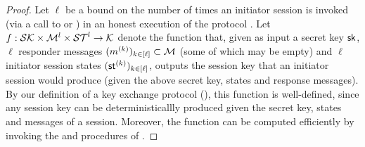 \begin{proof}
  Let \(\ell\) be a bound on the number of times an initiator session
  is invoked (via a call to \Init or \Run) in an honest execution of the protocol \prot{}.
  Let \(f : \mathcal{SK} \times \mathcal{M}^{l} \times \mathcal{ST}^{l} \to \mathcal{K} \)
  denote the function that, given as input a secret key \(\mathsf{sk}\),
  \(\ell\) responder messages \((m^{(k)})_{k \in [\ell]} \subset \mathcal{M}\) (some of which may be empty)
  and \(\ell\) initiator session states \((\mathsf{st}^{(k)})_{k \in [\ell]}\),
  outputs the session key that an initiator session would produce
  (given the above secret key, states and response messages).
  By our definition of a key exchange protocol (),
  this function is well-defined, since
  any session key can be deterministicallly produced given the secret key, states and messages of a session.
  Moreover, the function can be computed efficiently by invoking the \Init and \Run procedures of \prot{}.


\end{proof}
